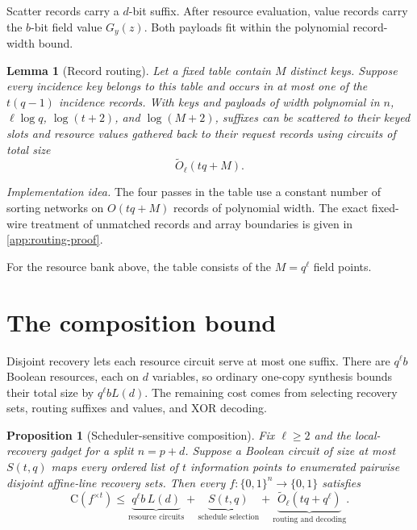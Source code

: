 \documentclass[11pt]{article}
\newtheorem{lemma}[lemma]{Lemma}
\newtheorem{proposition}[proposition]{Proposition}
\newcommand{\bits}{\{0,1\}}
\newcommand{\C}{\mathrm{C}}
\begin{document}
Scatter records carry a $d$-bit suffix.  After resource evaluation, value
records carry the $b$-bit field value $G_y(z)$.  Both payloads fit within the
polynomial record-width bound.

\begin{lemma}[Record routing]\label{lem:routing}
Let a fixed table contain $M$ distinct keys.  Suppose every incidence key
belongs to this table and occurs in at most one of the $t(q-1)$ incidence
records.  With keys and payloads of width polynomial in
$n$, $\ell\log q$, $\log(t+2)$, and $\log(M+2)$, suffixes can be scattered
to their keyed slots and resource values gathered back to their request
records using circuits of total size
\[
  \widetilde O_\ell(tq+M).
\]
\end{lemma}

\emph{Implementation idea.}
The four passes in the table use a constant number of sorting networks on
$O(tq+M)$ records of polynomial width.  The exact fixed-wire treatment
of unmatched records and array boundaries is given in
\cref{app:routing-proof}.

For the resource bank above, the table consists of the $M=q^\ell$ field points.

\section{The composition bound}\label{sec:master}

Disjoint recovery lets each resource circuit serve at most one suffix.
There are $q^\ell b$ Boolean resources, each on $d$ variables, so ordinary
one-copy synthesis bounds their total size by $q^\ell bL(d)$.  The remaining
cost comes from selecting recovery sets, routing suffixes and values, and
XOR decoding.

\begin{proposition}[Scheduler-sensitive composition]
\label{prop:scheduler-sensitive}
Fix $\ell\ge2$ and the local-recovery gadget for a split $n=p+d$.
Suppose a Boolean circuit of size at most $S(t,q)$ maps every ordered list
of $t$ information points to enumerated pairwise disjoint affine-line
recovery sets.  Then every $f:\bits^n\to\bits$ satisfies
\begin{equation}\label{eq:scheduler-sensitive}
\C(f^{\times t})
\le \underbrace{q^\ell b\,L(d)}_{\text{resource circuits}}
   +\underbrace{S(t,q)}_{\text{schedule selection}}
   +\underbrace{\widetilde O_\ell\!\left(tq+q^\ell\right)}_{
     \text{routing and decoding}}.
\end{equation}
\end{proposition}
\end{document}
